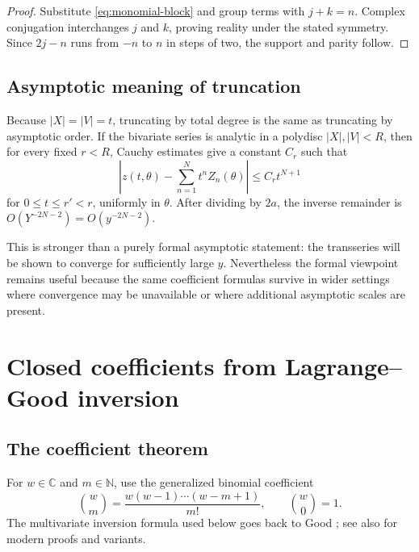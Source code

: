 \documentclass[11pt,oneside]{article}
\theoremstyle{plain}
\theoremstyle{definition}
\theoremstyle{remark}
\newcommand{\C}{\mathbb{C}}
\newcommand{\N}{\mathbb{N}}
\newcommand{\abs}[1]{\left\lvert#1\right\rvert}
\begin{document}
\begin{proof}
Substitute \eqref{eq:monomial-block} and group terms with \(j+k=n\).  Complex
conjugation interchanges \(j\) and \(k\), proving reality under the stated
symmetry.  Since \(2j-n\) runs from \(-n\) to \(n\) in steps of two, the
support and parity follow.
\end{proof}

\subsection{Asymptotic meaning of truncation}

Because \(\abs{X}=\abs{V}=t\), truncating by total degree is the same as
truncating by asymptotic order.  If the bivariate series is analytic in a
polydisc \(\abs{X},\abs{V}<R\), then for every fixed \(r<R\), Cauchy estimates
give a constant \(C_r\) such that
\begin{equation}
 \left|z(t,\theta)-\sum_{n=1}^{N}t^nZ_n(\theta)\right|
 \le C_r t^{N+1}
 \label{eq:uniform-block-remainder-preview}
\end{equation}
for \(0\le t\le r' < r\), uniformly in \(\theta\).  After dividing by \(2a\),
the inverse remainder is \(O(Y^{-2N-2})=O(y^{-2N-2})\).

This is stronger than a purely formal asymptotic statement: the transseries
will be shown to converge for sufficiently large \(y\).  Nevertheless the
formal viewpoint remains useful because the same coefficient formulas survive
in wider settings where convergence may be unavailable or where additional
asymptotic scales are present.

\section{Closed coefficients from Lagrange--Good inversion}
\label{sec:Good}

\subsection{The coefficient theorem}

For \(w\in\C\) and \(m\in\N\), use the generalized binomial coefficient
\begin{equation}
 \binom{w}{m}=\frac{w(w-1)\cdots(w-m+1)}{m!},
 \qquad \binom{w}{0}=1.
 \label{eq:generalized-binomial}
\end{equation}
The multivariate inversion formula used below goes back to Good
\cite{Good1960}; see also \cite{Gessel1987,Gessel2016,Sokal2009} for modern
proofs and variants.
\end{document}

